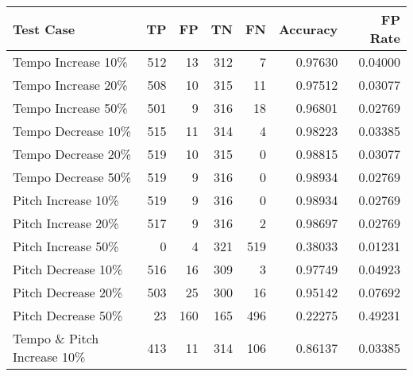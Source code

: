 \begin{table}[H]
    \begin{tabular}{|l|r|r|r|r|r|r|}
        \hline
        \textbf{Test Case}                 & \textbf{TP}   & \textbf{FP} & \textbf{TN} & \textbf{FN} & \textbf{Accuracy} & \textbf{FP Rate} \\ \hline
        Tempo Increase 10\%                & 512         & 13          & 312         & 7           & 0.97630           & 0.04000          \\ \hline
        Tempo Increase 20\%                & 508         & 10          & 315         & 11          & 0.97512           & 0.03077          \\ \hline
        Tempo Increase 50\%                & 501         & 9           & 316         & 18          & 0.96801           & 0.02769          \\ \hline
        Tempo Decrease 10\%                & 515         & 11          & 314         & 4           & 0.98223           & 0.03385          \\ \hline
        Tempo Decrease 20\%                & 519         & 10          & 315         & 0           & 0.98815           & 0.03077          \\ \hline
        Tempo Decrease 50\%                & 519         & 9           & 316         & 0           & 0.98934           & 0.02769          \\ \hline
        Pitch Increase 10\%                & 519         & 9           & 316         & 0           & 0.98934           & 0.02769          \\ \hline
        Pitch Increase 20\%                & 517         & 9           & 316         & 2           & 0.98697           & 0.02769          \\ \hline
        Pitch Increase 50\%                & 0           & 4           & 321         & 519         & 0.38033           & 0.01231          \\ \hline
        Pitch Decrease 10\%                & 516         & 16          & 309         & 3           & 0.97749           & 0.04923          \\ \hline
        Pitch Decrease 20\%                & 503         & 25          & 300         & 16          & 0.95142           & 0.07692          \\ \hline
        Pitch Decrease 50\%                & 23          & 160         & 165         & 496         & 0.22275           & 0.49231          \\ \hline
        Tempo  \& Pitch Increase 10\%      & 413         & 11          & 314         & 106         & 0.86137           & 0.03385          \\ \hline

\end{tabular}
\end{table}
